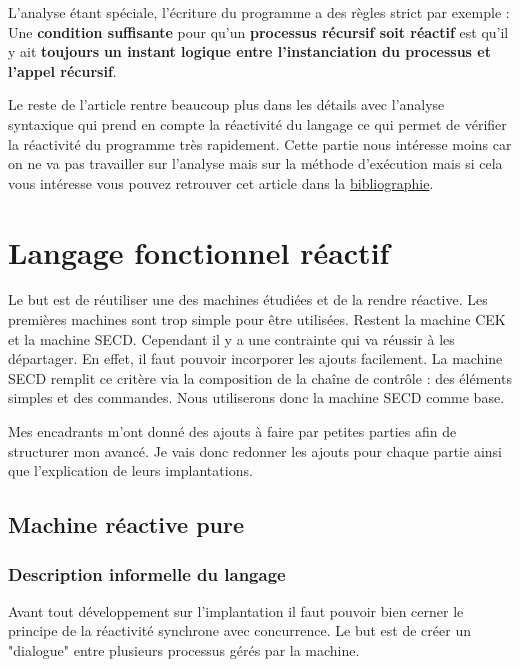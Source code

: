 \documentclass[10pt,a4paper]{report}
\begin{document}
	
	L'analyse étant spéciale, l'écriture du programme a des règles strict par exemple :
	Une \textbf{condition suffisante} pour qu'un \textbf{processus r\'{e}cursif soit r\'{e}actif} est qu'il y ait \textbf{toujours} \textbf{un instant logique entre l'instanciation du processus et l'appel r\'{e}cursif}.
	\bigbreak
	
	
	Le reste de l'article rentre beaucoup plus dans les détails avec l'analyse syntaxique qui prend en compte la réactivité du langage ce qui permet de vérifier la réactivité du programme très rapidement. Cette partie nous intéresse moins car on ne va pas travailler sur l'analyse mais sur la méthode d'exécution mais si cela vous intéresse vous pouvez retrouver cet article dans la \hyperref[biblio]{bibliographie}.
	
	
	\chapter{Langage fonctionnel réactif}\label{SECDConc4}
	
	Le but est de réutiliser une des machines étudiées et de la rendre réactive. Les premières machines sont trop simple pour être utilisées. Restent la machine CEK et la machine SECD. Cependant il y a une contrainte qui va réussir à les départager. En effet, il faut pouvoir incorporer les ajouts facilement. La machine SECD remplit ce critère via la composition de la chaîne de contrôle : des éléments simples et des commandes. Nous utiliserons donc la machine SECD comme base.
	\medbreak
	
	Mes encadrants m'ont donné des ajouts à faire par petites parties afin de structurer mon avancé. Je vais donc redonner les ajouts pour chaque partie ainsi que l'explication de leurs implantations.
	\bigbreak
	
	
	\section{Machine réactive pure}
	
	\subsection{Description informelle du langage}
	
	Avant tout développement sur l'implantation il faut pouvoir bien cerner le principe de la réactivité synchrone avec concurrence. Le but est de créer un "dialogue" entre plusieurs processus gérés par la machine. 
	\medbreak
	
\end{document}

